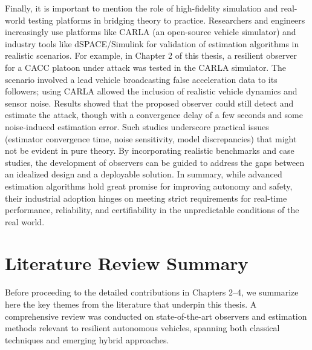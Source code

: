 Finally, it is important to mention the role of high-fidelity simulation and real-world testing platforms in bridging theory to practice. Researchers and engineers increasingly use platforms like CARLA \cite{CarlarSim} (an open-source vehicle simulator) and industry tools like dSPACE/Simulink for validation of estimation algorithms in realistic scenarios. For example, in Chapter 2 of this thesis, a resilient observer for a CACC platoon under attack was tested in the CARLA simulator. The scenario involved a lead vehicle broadcasting false acceleration data to its followers; using CARLA allowed the inclusion of realistic vehicle dynamics and sensor noise. Results showed that the proposed observer could still detect and estimate the attack, though with a convergence delay of a few seconds and some noise-induced estimation error. Such studies underscore practical issues (estimator convergence time, noise sensitivity, model discrepancies) that might not be evident in pure theory. By incorporating realistic benchmarks and case studies, the development of observers can be guided to address the gaps between an idealized design and a deployable solution. In summary, while advanced estimation algorithms hold great promise for improving autonomy and safety, their industrial adoption hinges on meeting strict requirements for real-time performance, reliability, and certifiability in the unpredictable conditions of the real world.


\section{Literature Review Summary}
Before proceeding to the detailed contributions in Chapters 2–4, we summarize here the key themes from the literature that underpin this thesis. A comprehensive review was conducted on state-of-the-art observers and estimation methods relevant to resilient autonomous vehicles, spanning both classical techniques and emerging hybrid approaches.

